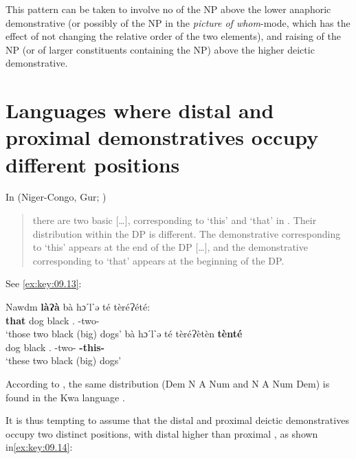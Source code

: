 \documentclass[output=paper]{langsci/langscibook}
\begin{document}
This pattern can be taken to involve no  of the NP above the lower
anaphoric demonstrative (or possibly  of the NP in the
\emph{picture of whom}-mode, which has the effect of not changing the relative
order of the two elements), and raising of the NP (or of larger constituents
containing the NP) above the higher deictic demonstrative.

\section{Languages where distal and proximal demonstratives occupy different
positions}

In  (Niger-Congo, Gur; \citealt[§2.4]{Albro1998})

\begin{quote}there are
    two basic  [\dots{}], corresponding to \enquote*{this} and
    \enquote*{that} in . Their distribution within the DP is different.
    The demonstrative corresponding to \enquote*{this} appears at the end of
    the DP [\dots{}], and the demonstrative corresponding to \enquote*{that}
appears at the beginning of the DP.
\end{quote}

See \eqref{ex:key:09.13}:

\ea Nawdm \parencite[6]{Albro1998}\label{ex:key:09.13}
	\ea
		\gll \textbf{làɁà} bà  hɔˊlˋə  té  tèréɁété:\\
			\textbf{that} dog black \Cl.\Pl{} \Cl{}-two-\Cl{}\\
		\glt ‘those two black (big) dogs’
	\ex
		\gll bà hɔˊlˋə té tèréɁètèn \textbf{tènté}\\
			dog black \Cl.\Pl{} \Cl{}-two-\Cl{} \textbf{\Cl{}-this-\Cl{}}\\
		\glt ‘these two black (big) dogs’
	\z
\z

According to \textcite[66ff]{Apronti1971}, the same distribution (Dem
N A Num and N A Num Dem) is found in the Kwa language
.

It is thus tempting to assume that the distal and proximal deictic
demonstratives occupy two distinct  positions, with distal 
higher than proximal , as shown in\eqref{ex:key:09.14}:
\end{document}
